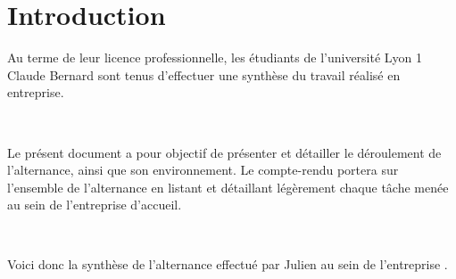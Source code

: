 \chapter*{Introduction}
Au terme de leur licence professionnelle, les étudiants de l'université Lyon 1 Claude Bernard sont tenus d'effectuer une synthèse du travail réalisé en entreprise.

~

Le présent document a pour objectif de présenter et détailler le déroulement de l'alternance, ainsi que son environnement. Le compte-rendu portera sur l'ensemble de l'alternance en listant et détaillant légèrement chaque tâche menée au sein de l'entreprise d'accueil.

~

Voici donc la synthèse de l'alternance effectué par Julien  au sein de l'entreprise \solulog{}.